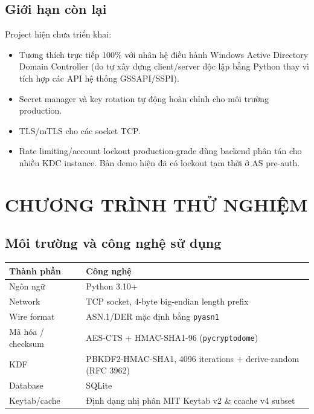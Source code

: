 \documentclass[12pt]{article}
\begin{document}
\subsection{Giới hạn còn lại}

Project hiện chưa triển khai:
\begin{itemize}
    \item Tương thích trực tiếp 100\% với nhân hệ điều hành Windows Active Directory Domain Controller (do tự xây dựng client/server độc lập bằng Python thay vì tích hợp các API hệ thống GSSAPI/SSPI).
    \item Secret manager và key rotation tự động hoàn chỉnh cho môi trường production.
    \item TLS/mTLS cho các socket TCP.
    \item Rate limiting/account lockout production-grade dùng backend phân tán cho nhiều KDC instance. Bản demo hiện đã có lockout tạm thời ở AS pre-auth.
\end{itemize}

\section{CHƯƠNG TRÌNH THỬ NGHIỆM}

\subsection{Môi trường và công nghệ sử dụng}

\begin{table}[H]
\centering
\renewcommand{\arraystretch}{1.25}
\begin{tabularx}{\textwidth}{|p{4.5cm}|X|}
\hline
\textbf{Thành phần} & \textbf{Công nghệ} \\
\hline
Ngôn ngữ & Python 3.10+ \\
\hline
Network & TCP socket, 4-byte big-endian length prefix \\
\hline
Wire format & ASN.1/DER mặc định bằng \texttt{pyasn1} \\
\hline
Mã hóa / checksum & AES-CTS + HMAC-SHA1-96 (\texttt{pycryptodome}) \\
\hline
KDF & PBKDF2-HMAC-SHA1, 4096 iterations + derive-random (RFC 3962) \\
\hline
Database & SQLite \\
\hline
Keytab/cache & Định dạng nhị phân MIT Keytab v2 \& ccache v4 subset \\
\hline
\end{tabularx}
\end{table}
\end{document}
